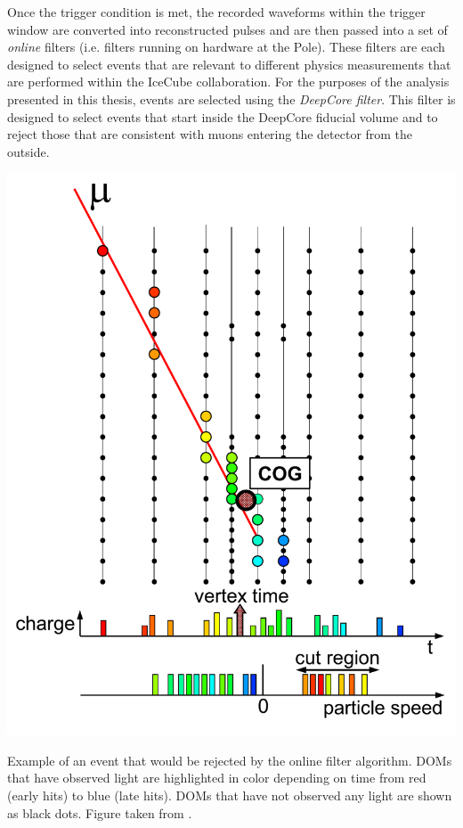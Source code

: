 Once the trigger condition is met, the recorded waveforms within the trigger window are converted into reconstructed pulses and are then passed into a set of \emph{online} filters (i.e. filters running on hardware at the Pole). These filters are each designed to select events that are relevant to different physics measurements that are performed within the IceCube collaboration. For the purposes of the analysis presented in this thesis, events are selected using the \emph{DeepCore filter}. This filter is designed to select events that start inside the DeepCore fiducial volume and to reject those that are consistent with muons entering the detector from the outside.
\begin{marginfigure}
    \includegraphics[width=\textwidth]{figures/icecube/eventviews/FilterDiagram.pdf}
    \caption{Example of an event that would be rejected by the online filter algorithm. DOMs that have observed light are highlighted in color depending on time from red (early hits) to blue (late hits). DOMs that have not observed any light are shown as black dots. Figure taken from \cite{DeepCore}.}
    \label{fig:online-filter-event}
\end{marginfigure}
